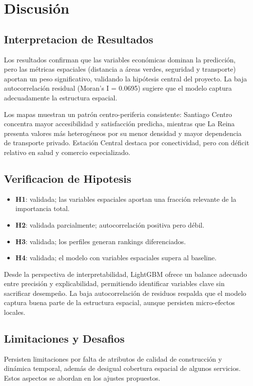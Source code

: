 \documentclass[11pt,letterpaper]{article}
\begin{document}
\section{Discusión}

\subsection{Interpretacion de Resultados}
Los resultados confirman que las variables económicas dominan la predicción, pero las métricas espaciales (distancia a áreas verdes, seguridad y transporte) aportan un peso significativo, validando la hipótesis central del proyecto. La baja autocorrelación residual (Moran's I = 0.0695) sugiere que el modelo captura adecuadamente la estructura espacial.

Los mapas muestran un patrón centro-periferia consistente: Santiago Centro concentra mayor accesibilidad y satisfacción predicha, mientras que La Reina presenta valores más heterogéneos por su menor densidad y mayor dependencia de transporte privado. Estación Central destaca por conectividad, pero con déficit relativo en salud y comercio especializado.

\subsection{Verificacion de Hipotesis}
\begin{itemize}
    \item \textbf{H1}: validada; las variables espaciales aportan una fracción relevante de la importancia total.
    \item \textbf{H2}: validada parcialmente; autocorrelación positiva pero débil.
    \item \textbf{H3}: validada; los perfiles generan rankings diferenciados.
    \item \textbf{H4}: validada; el modelo con variables espaciales supera al baseline.
\end{itemize}

Desde la perspectiva de interpretabilidad, LightGBM ofrece un balance adecuado entre precisión y explicabilidad, permitiendo identificar variables clave sin sacrificar desempeño. La baja autocorrelación de residuos respalda que el modelo captura buena parte de la estructura espacial, aunque persisten micro-efectos locales.

\subsection{Limitaciones y Desafios}
Persisten limitaciones por falta de atributos de calidad de construcción y dinámica temporal, además de desigual cobertura espacial de algunos servicios. Estos aspectos se abordan en los ajustes propuestos.
\end{document}
